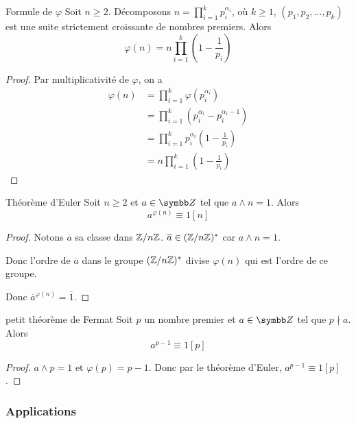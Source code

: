 \begin{theoreme}{Formule de $\varphi$}{}
    Soit $n \geqslant 2$. Décomposons $\displaystyle n = \prod_{i = 1}^k p_i^{\alpha_i}$, où 
    $k \geqslant 1$, $(p_1, p_2, \ldots, p_k)$ est une suite strictement croissante de nombres premiers. 
    Alors \[\varphi(n) = n \prod_{i = 1}^k \left(1 - \frac 1 {p_i}\right)\]
\end{theoreme}

\begin{proof}
    Par multiplicativité de $\varphi$, on a
    \begin{align*}
        \varphi(n) & = \prod_{i = 1}^k \varphi(p_i^{\alpha_i}) \\
        & = \prod_{i = 1}^k \left(p_i^{\alpha_i} - p_i^{\alpha_i - 1}\right) \\
        & = \prod_{i = 1}^k p_i^{\alpha_i} \left( 1 - \frac 1 {p_i} \right) \\
        & = n \prod_{i = 1}^k \left(1 - \frac 1 {p_i}\right)
    \end{align*}
\end{proof}

\begin{theoreme}{Théorème d'Euler}{}
    Soit $n \geqslant 2$ et $a \in \Z$ tel que $a \wedge n = 1$.
    Alors \[a^{\varphi(n)} \equiv 1 [n]\]
\end{theoreme}

\begin{proof}
    Notons $\overline a $ sa classe dans $\mathbb{Z}/n\mathbb{Z}$. $\overline a \in (\mathbb{Z}/n\mathbb{Z})^*$ car 
    $a \wedge n = 1$.

    Donc l'ordre de $\overline a$ dans le groupe $(\mathbb{Z}/n\mathbb{Z})^*$ divise $\varphi(n)$ qui 
    est l'ordre de ce groupe.

    Donc $\overline a^{\varphi(n)} = \overline 1$.
\end{proof}

\begin{corollaire}{petit théorème de Fermat}{}
    Soit $p$ un nombre premier et $a \in \Z$ tel que $p \nmid a$.
    Alors \[a^{p - 1} \equiv 1 [p]\]
\end{corollaire}

\begin{proof}
    $a \wedge p = 1$ et $\varphi(p) = p - 1$.
    Donc par le théorème d'Euler, $a^{p - 1} \equiv 1 [p]$.
\end{proof}

\subsubsection{Applications}

